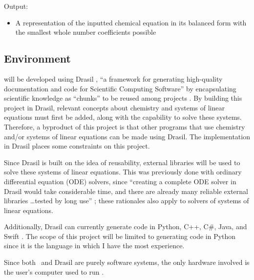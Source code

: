 \documentclass{article}
\begin{document}
\noindent Output:

\begin{itemize}
	\item A representation of the inputted chemical equation in its balanced
	      form with the smallest whole number coefficients possible
\end{itemize}

\subsection{Environment} \label{env}

\progname{} will be developed using Drasil
\cite{carette_drasil_2021}, ``a framework for generating
high-quality documentation and code for Scientific Computing Software''
\cite[p. iii]{maclachlan_design_2020} by encapsulating scientific knowledge as
``chunks'' to be reused among projects \cite{maclachlan_design_2020}. By
building this project in Drasil, relevant concepts about chemistry and systems
of linear equations must first be added, along with the capability to solve
these systems. Therefore, a byproduct of this project is that other programs
that use chemistry and/or systems of linear equations can be made using
Drasil. The implementation in Drasil places some constraints on this project.

Since Drasil is built on the idea of reusability, external libraries will be
used to solve these systems of linear equations. This was previously done with
ordinary differential equation (ODE) solvers, since ``creating a complete ODE
solver in Drasil would take considerable time, and there are already many
reliable external libraries \dots tested by long use''
\cite[p. 24]{chen_solving_2022}; these rationales also apply to solvers of
systems of linear equations.

Additionally, Drasil can currently generate code in Python, C++, C\#, Java, and
Swift \cite{chen_solving_2022}. The scope of this project will be limited to
generating code in Python since it is the language in which I
have the most experience.

Since both \progname~and Drasil are purely software systems, the only
hardware involved is the user's computer used to run \progname{}.
\end{document}
